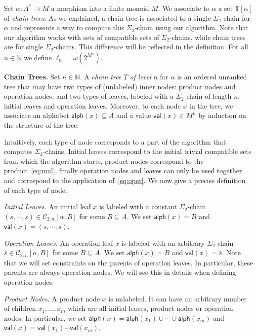 \documentclass[envcountsame]{llncs}
\newcommand\nat{\ensuremath{\mathbb{N}}\xspace}
\newcommand\Cs{\ensuremath{\mathcal{C}}\xspace}
\newcommand\Cstwolen[1]{\ensuremath{\Cs_{2,#1}}\xspace}
\newcommand\Cstwon{\ensuremath{\Cstwolen{n}}\xspace}
\newcommand\ct{\ensuremath{\mathbb{T}}\xspace}
\newcommand{\sic}[1]{\ensuremath{\Sigma_{#1}}\xspace}
\newcommand\content[1]{\ensuremath{\contentmorphism(#1)}}
\newcommand\contentmorphism{\ensuremath{\textsf{alph}}}
\newcommand\val[1]{\ensuremath{\textsf{val}(#1)\xspace}}
\newcommand\chain{chain\xspace}
\newcommand\qchain[1]{\ensuremath{\sic{#1}}-chain\xspace}
\newcommand\qchains[1]{\ensuremath{\sic{#1}}-chains\xspace}
\newcommand\Chain{Chain\xspace}
\newcommand\dchain{\qchain{2}}
\newcommand\dchains{\qchains{2}}
\begin{document}
Set $\alpha: A^* \rightarrow M$ a morphism into a finite monoid $M$. We
associate to $\alpha$ a set $\ct[\alpha]$ of \emph{\chain trees}. As we
explained, a \chain tree is associated to a single \dchain for $\alpha$ and
represents a way to compute this \dchain using our algorithm. Note that our
algorithm works with sets of compatible sets of \dchains, while \chain trees
are for single \dchains. This difference will be reflected in the definition.
For all $n \in \nat$ we define $\ell_n = \omega(2^{M^n})$.

\medskip
\noindent
{\bf \Chain Trees.} Set $n \in \nat$. A \emph{\chain tree} $T$ \emph{of
  level} $n$ for $\alpha$ is an ordered unranked tree that may have
two types of (unlabeled) inner nodes: product nodes and operation
nodes, and two types of leaves, labeled with a \dchain of length $n$:
initial leaves and operation leaves. Moreover, to each node $x$ in
the tree, we associate an alphabet $\content{x} \subseteq A$ and a
value $\val{x} \in M^n$ by induction on the structure of the tree.

Intuitively, each type of node corresponds to a part of the algorithm that
computes \dchains. Initial leaves correspond to the initial trivial compatible
sets from which the algorithm starts, product nodes correspond to the product~\eqref{eq:mul},
finally operation nodes and leaves can only be used together and correspond to
the application of~\eqref{eq:oper}. We now give a precise definition of each
type of node.

\medskip
\noindent
{\it Initial Leaves.} An initial leaf $x$ is labeled  with a constant
\dchain $(s,\cdots,s) \in \Cstwon[\alpha,B]$ for some $B \subseteq A$.
We set $\content{x} = B$ and $\val{x} = (s,\cdots,s)$.

\medskip
\noindent
{\it Operation Leaves.} An operation leaf $x$ is labeled with an arbitrary
\dchain $\bar{s} \in \Cstwon[\alpha,B]$ for some $B \subseteq A$.
We set $\content{x} = B$ and $\val{x} = \bar{s}$. Note that we
will set constraints on the parents of operation leaves. In
particular, these parents are always operation nodes. We will see
this in details when defining operation nodes.


\medskip
\noindent
{\it Product Nodes.} A product node $x$ is unlabeled. It can have an
arbitrary number of children $x_1,\dots,x_m$ which are all initial
leaves, product nodes or operation nodes. In particular, we set
$\content{x} = \content{x_1} \cup \cdots \cup \content{x_m}$ and
$\val{x} = \val{x_1} \cdots \val{x_m}$.
\end{document}
